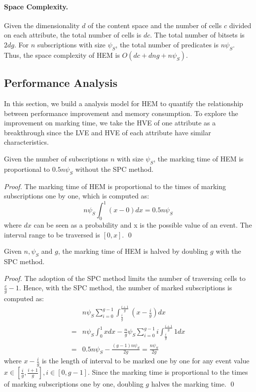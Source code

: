 \documentclass[runningheads]{llncs}
\begin{document}
\paragraph{Space Complexity.} Given the dimensionality $d$ of the content space and the number of cells $c$ divided on each attribute, the total number of cells is $dc$. The total number of bitsets is $2dg$. For $n$ subscriptions with size $\psi_S$, the total number of predicates is $n\psi_S$. Thus, the space complexity of HEM is $O(dc+dng+n\psi_S)$.

\subsection{Performance Analysis}
\label{peim}
In this section, we build a analysis model for HEM to quantify the relationship between performance improvement and memory consumption. To explore the improvement on marking time, we take the HVE of one attribute as a breakthrough since the LVE and HVE of each attribute have similar characteristics.

\begin{lemma}
\label{lemma1}
Given the number of subscriptions $n$ with size $\psi_S$, the marking time of HEM is proportional to $0.5n\psi_S$ without the SPC method.
\end{lemma}
\begin{proof}
The marking time of HEM is proportional to the times of marking subscriptions one by one, which is computed as:
    \begin{equation}
        n\psi_S\int_0^1(x-0)dx=0.5n\psi_S
    \end{equation}
where $dx$ can be seen as a probability and x is the possible value of an event. The interval range to be traversed is $[0,x]$. \qed
\end{proof}

\begin{lemma}
\label{lemma2}
Given $n,\psi_S$ and $g$, the marking time of HEM is halved by doubling $g$ with the SPC method. %
\end{lemma}
\begin{proof}
The adoption of the SPC method limits the number of traversing cells to $\frac{c}{g}-1$. Hence, with the SPC method, the number of marked subscriptions is computed as:
    \begin{equation}
\begin{aligned}
    \label{eq1}
        & n\psi_S\sum_{i=0}^{g-1}\int_\frac{i}{g}^{\frac{i+1}{g}}(x-\frac{i}{g})dx  \\ 
        = {} & n\psi_S\int_0^1xdx-\frac{n}{g}\psi_S\sum_{i=0}^{g-1} i\int_\frac{i}{g}^{\frac{i+1}{g}}1dx \\
        = {} & 0.5n\psi_S-\frac{(g-1)n\psi_S}{2g} = \frac{n\psi_S}{2g} 
    \end{aligned}
    \end{equation}
where $x-\frac{i}{g}$ is the length of interval to be marked one by one for any event value $x\in [\frac{i}{g}, \frac{i+1}{g}], i\in[0,g-1]$. Since the marking time is proportional to the times of marking subscriptions one by one, doubling $g$ halves the marking time. \qed
\end{proof}
\end{document}
